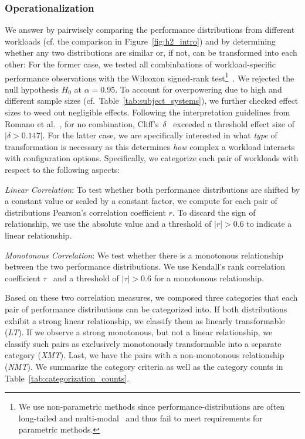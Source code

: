 {\subsubsection{Operationalization}
We answer  by pairwisely comparing the performance distributions from different workloads (cf. the comparison in Figure~\ref{fig:h2_intro}) and by determining whether any two distributions are similar or, if not, can be transformed into each other: For the former case, we tested all combinbations of workload-specific performance observations with the Wilcoxon signed-rank test\footnote{We use non-parametric methods since performance-distributions are often long-tailed and multi-modal~\cite{curtsinger_stabilizer_2013,maricq2018taming} and thus fail to meet requirements for parametric methods.}~\cite{lovric_international_2010}. We rejected the null hypothesis $H_0$ at $\alpha=0.95$. To account for overpowering due to high and different sample sizes (cf.~Table~\ref{tab:subject_systems}), we further checked effect sizes to weed out negligible effects. Following the interpretation guidelines from Romano et al.~\cite{romano2006exploring}, for no combination, Cliff's~$\delta$~\cite{Cliff1993DominanceSO} exceeded a threshold effect size of $\vert\delta > 0.147\vert$.
For the latter case, we are specifically interested in what \textit{type} of transformation is necessary as this determines \textit{how} complex a workload interacts with configuration options. Specifically, we categorize each pair of workloads with respect to the following aspects: 

\begin{compactenum}

	\item \textit{Linear Correlation}: To test whether both performance distributions are shifted by a constant value or scaled by a constant factor, we compute for each pair of distributions Pearson's correlation coefficient $r$. To discard the sign of relationship, we use the absolute value and a threshold of $\vert r\vert >0.6$ to indicate a linear relationship.
	
	\item \textit{Monotonous Correlation}: We test whether there is a monotonous relationship between the two performance distributions. We use Kendall's rank correlation coefficient $\tau$~\cite{kendall1938new} and a threshold of  $\vert\tau\vert > 0.6$ for a monotonous relationship.
\end{compactenum}
{\color{black}Based on these two correlation measures, we composed three categories that each pair of performance distributions can be categorized into.
If both distributions exhibit a strong linear relationship, we classify them as linearly transformable (\textit{\colorbox{lt-color!60}{LT}}). If we observe a strong monotonous, but not a linear relationship, we classify such pairs as exclusively monotonously transformable into a separate category (\textit{\colorbox{xmt-color!60}{XMT}}). Last, we have the pairs with a non-monotonous relationship  (\textit{\colorbox{nmt-color!60}{NMT}}). 
We summarize the category criteria as well as the category counts in Table~\ref{tab:categorization_counts}. 

}}
